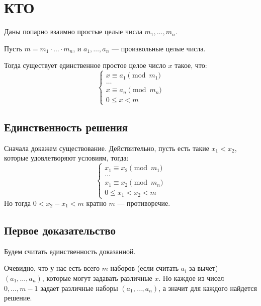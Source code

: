 \section{КТО}

\begin{thrm}{}{}
    Даны попарно взаимно простые целые числа \( m_1, \ldots, m_n \).

    Пусть \( m = m_1 \cdot \ldots \cdot m_n \), и \( a_1, \ldots, a_n \) --- произвольные целые числа.

    Тогда существует единственное простое целое число \( x \) такое, что:
    \[
        \begin{cases}
            x \equiv a_1 \pmod {m_1}
            \\
            \ldots
            \\
            x \equiv a_n \pmod {m_n}
            \\
            0 \leq x < m
        \end{cases}
    \]
\end{thrm}

\subsection{Единственность решения}

Сначала докажем существование.
Действительно, пусть есть такие \( x_1 < x_2 \), которые удовлетворяют условиям, тогда:
\[
    \begin{cases}
        x_1 \equiv x_2 \pmod {m_1}
        \\
        \ldots
        \\
        x_1 \equiv x_2 \pmod {m_n}
        \\
        0 \leq x_1 < x_2 < m
    \end{cases}
\]
Но тогда \( 0 < x_2 - x_1 < m \) кратно \( m \) --- противоречие.

\subsection{Первое доказательство}

Будем считать единственность доказанной.

Очевидно, что у нас есть всего \( m \) наборов (если считать \( a_i \) за вычет) \( (a_1, \ldots, a_n) \),
которые могут задавать различные \( x \).
Но каждое из чисел \( 0, \ldots, m - 1 \) задает различные наборы \( (a_1, \ldots, a_n) \),
а значит для каждого найдется решение.

